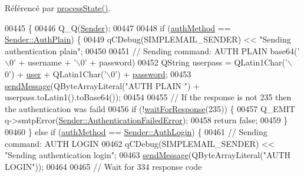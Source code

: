 Référencé par \hyperlink{class_simple_mail_1_1_sender_private_ab3a7663dd6945ce2ba074d37cfc4e4ec}{process\+State()}.


\begin{DoxyCode}
00445 \{
00446     Q\_Q(\hyperlink{class_simple_mail_1_1_sender}{Sender});
00447 
00448     \textcolor{keywordflow}{if} (\hyperlink{class_simple_mail_1_1_sender_private_afd60fe3edc740b9624746316ad798647}{authMethod} == \hyperlink{class_simple_mail_1_1_sender_af50defb714bc3e95f47c71a9ba6ee6bba28927645560285ef540f6f2471be4584}{Sender::AuthPlain}) \{
00449         qCDebug(SIMPLEMAIL\_SENDER) << \textcolor{stringliteral}{"Sending authentication plain"};
00450 
00451         \textcolor{comment}{// Sending command: AUTH PLAIN base64('\(\backslash\)0' + username + '\(\backslash\)0' + password)}
00452         QString userpass = QLatin1Char(\textcolor{charliteral}{'\(\backslash\)0'}) + \hyperlink{class_simple_mail_1_1_sender_private_ac3efab988a41e60a0a56c29a1d5b04ed}{user} + QLatin1Char(\textcolor{charliteral}{'\(\backslash\)0'}) + 
      \hyperlink{class_simple_mail_1_1_sender_private_aac5b192258bcf97c2249fc944c17ee32}{password};
00453         \hyperlink{class_simple_mail_1_1_sender_private_a01805bb24291bf6cad3a656a16d0bb25}{sendMessage}(QByteArrayLiteral(\textcolor{stringliteral}{"AUTH PLAIN "}) + userpass.toLatin1().toBase64());
00454 
00455         \textcolor{comment}{// If the response is not 235 then the authentication was faild}
00456         \textcolor{keywordflow}{if} (!\hyperlink{class_simple_mail_1_1_sender_private_af8ba23dc3e1201d303ad1d923235c71c}{waitForResponse}(235)) \{
00457             Q\_EMIT q->smtpError(\hyperlink{class_simple_mail_1_1_sender_a276560e9e955ab6be451338c3776bf49a2d402af356c1513cf08749bf7a204703}{Sender::AuthenticationFailedError});
00458             \textcolor{keywordflow}{return} \textcolor{keyword}{false};
00459         \}
00460     \} \textcolor{keywordflow}{else} \textcolor{keywordflow}{if} (\hyperlink{class_simple_mail_1_1_sender_private_afd60fe3edc740b9624746316ad798647}{authMethod} == \hyperlink{class_simple_mail_1_1_sender_af50defb714bc3e95f47c71a9ba6ee6bba7e64ad152ea68f105718f3680f8f054b}{Sender::AuthLogin}) \{
00461         \textcolor{comment}{// Sending command: AUTH LOGIN}
00462         qCDebug(SIMPLEMAIL\_SENDER) << \textcolor{stringliteral}{"Sending authentication login"};
00463         \hyperlink{class_simple_mail_1_1_sender_private_a01805bb24291bf6cad3a656a16d0bb25}{sendMessage}(QByteArrayLiteral(\textcolor{stringliteral}{"AUTH LOGIN"}));
00464 
00465         \textcolor{comment}{// Wait for 334 response code}

\end{DoxyCode}
